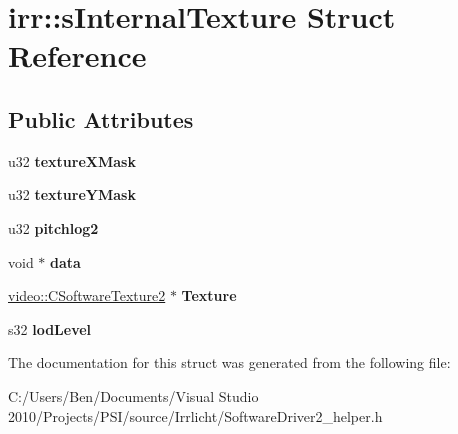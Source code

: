 \hypertarget{structirr_1_1s_internal_texture}{\section{irr\-:\-:s\-Internal\-Texture Struct Reference}
\label{structirr_1_1s_internal_texture}
}
\subsection*{Public Attributes}
\begin{DoxyCompactItemize}
\item 
\hypertarget{structirr_1_1s_internal_texture_ad2197a91a4e08db649fa4e6bfa5344c8}{u32 {\bfseries texture\-X\-Mask}}\label{structirr_1_1s_internal_texture_ad2197a91a4e08db649fa4e6bfa5344c8}

\item 
\hypertarget{structirr_1_1s_internal_texture_ac21ca84783afe004eef35700cb90ddef}{u32 {\bfseries texture\-Y\-Mask}}\label{structirr_1_1s_internal_texture_ac21ca84783afe004eef35700cb90ddef}

\item 
\hypertarget{structirr_1_1s_internal_texture_a49255e132e0c0fb669614d7577b46509}{u32 {\bfseries pitchlog2}}\label{structirr_1_1s_internal_texture_a49255e132e0c0fb669614d7577b46509}

\item 
\hypertarget{structirr_1_1s_internal_texture_a8cb4dad1449f082df961bdbd75981366}{void $\ast$ {\bfseries data}}\label{structirr_1_1s_internal_texture_a8cb4dad1449f082df961bdbd75981366}

\item 
\hypertarget{structirr_1_1s_internal_texture_a70099147c2bfc832f62f2703bdea9a9d}{\hyperlink{classirr_1_1video_1_1_c_software_texture2}{video\-::\-C\-Software\-Texture2} $\ast$ {\bfseries Texture}}\label{structirr_1_1s_internal_texture_a70099147c2bfc832f62f2703bdea9a9d}

\item 
\hypertarget{structirr_1_1s_internal_texture_a7b1de0cb0894bc1f56457a4e8dc13418}{s32 {\bfseries lod\-Level}}\label{structirr_1_1s_internal_texture_a7b1de0cb0894bc1f56457a4e8dc13418}

\end{DoxyCompactItemize}


The documentation for this struct was generated from the following file\-:\begin{DoxyCompactItemize}
\item 
C\-:/\-Users/\-Ben/\-Documents/\-Visual Studio 2010/\-Projects/\-P\-S\-I/source/\-Irrlicht/Software\-Driver2\-\_\-helper.\-h\end{DoxyCompactItemize}

